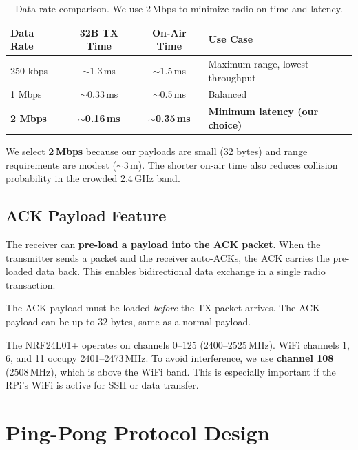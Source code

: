\documentclass[11pt,a4paper]{article}
\begin{document}
\begin{table}[htbp]
\centering
\caption{Data rate comparison. We use 2\,Mbps to minimize radio-on time and latency.}
\begin{tabular}{l c c l}
\toprule
\textbf{Data Rate} & \textbf{32B TX Time} & \textbf{On-Air Time} & \textbf{Use Case} \\
\midrule
250 kbps & ${\sim}$1.3\,ms & ${\sim}$1.5\,ms & Maximum range, lowest throughput \\
1 Mbps & ${\sim}$0.33\,ms & ${\sim}$0.5\,ms & Balanced \\
\textbf{2 Mbps} & \textbf{${\sim}$0.16\,ms} & \textbf{${\sim}$0.35\,ms} & \textbf{Minimum latency (our choice)} \\
\bottomrule
\end{tabular}
\label{tab:data-rates}
\end{table}

We select \textbf{2\,Mbps} because our payloads are small (32 bytes) and range requirements are modest (${\sim}$3\,m). The shorter on-air time also reduces collision probability in the crowded 2.4\,GHz band.

\subsection{ACK Payload Feature}

The receiver can \textbf{pre-load a payload into the ACK packet}. When the transmitter sends a packet and the receiver auto-ACKs, the ACK carries the pre-loaded data back. This enables bidirectional data exchange in a single radio transaction.

The ACK payload must be loaded \emph{before} the TX packet arrives. The ACK payload can be up to 32 bytes, same as a normal payload.

\begin{infobox}
The NRF24L01+ operates on channels 0--125 (2400--2525\,MHz). WiFi channels 1, 6, and 11 occupy 2401--2473\,MHz. To avoid interference, we use \textbf{channel 108} (2508\,MHz), which is above the WiFi band. This is especially important if the RPi's WiFi is active for SSH or data transfer.
\end{infobox}


\section{Ping-Pong Protocol Design}
\end{document}
